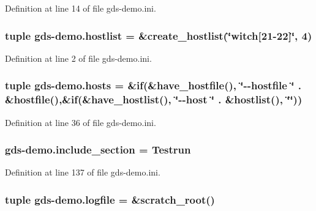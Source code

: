Definition at line 14 of file gds-\/demo.\-ini.

\hypertarget{namespacegds-demo_a021b9480541541d7ed577ad25eddf802}{
\subsubsection[{hostlist}]{\setlength{\rightskip}{0pt plus 5cm}tuple gds-\/demo.\-hostlist = \&create\-\_\-hostlist(\char`\"{}witch\mbox{[}21-\/22\mbox{]}\char`\"{}, 4)}}\label{namespacegds-demo_a021b9480541541d7ed577ad25eddf802}


Definition at line 2 of file gds-\/demo.\-ini.

\hypertarget{namespacegds-demo_a5d35655c0d94700bdf5cd1c850d5629f}{
\subsubsection[{hosts}]{\setlength{\rightskip}{0pt plus 5cm}tuple gds-\/demo.\-hosts = \&if(\&have\-\_\-hostfile(), \char`\"{}-\/-\/hostfile \char`\"{} . \&hostfile(),\&if(\&have\-\_\-hostlist(), \char`\"{}-\/-\/host \char`\"{} . \&hostlist(), \char`\"{}\char`\"{}))}}\label{namespacegds-demo_a5d35655c0d94700bdf5cd1c850d5629f}


Definition at line 36 of file gds-\/demo.\-ini.

\hypertarget{namespacegds-demo_a05285f89342c69f06e7095d725a598a9}{
\subsubsection[{include\-\_\-section}]{\setlength{\rightskip}{0pt plus 5cm}gds-\/demo.\-include\-\_\-section = Testrun}}\label{namespacegds-demo_a05285f89342c69f06e7095d725a598a9}


Definition at line 137 of file gds-\/demo.\-ini.

\hypertarget{namespacegds-demo_afef42fececa25d4cb15454b29b84e89b}{
\subsubsection[{logfile}]{\setlength{\rightskip}{0pt plus 5cm}tuple gds-\/demo.\-logfile = \&scratch\-\_\-root()}}\label{namespacegds-demo_afef42fececa25d4cb15454b29b84e89b}


